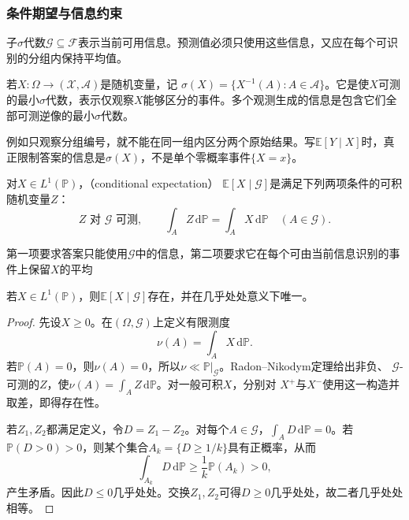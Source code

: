 \subsubsection{条件期望与信息约束}

子\(\sigma\)代数\(\mathcal{G}\subseteq\mathcal{F}\)表示当前可用信息。预测值必须只使用这些信息，又应在每个可识别的分组内保持平均值。
\begin{definition}[观测生成的信息]
  \label{def:probability-generated-information}
若\(X:\Omega\to(\mathcal X,\mathcal A)\)是随机变量，记
\(\sigma(X)=\{X^{-1}(A):A\in\mathcal A\}\)。它是使\(X\)可测的最小\(\sigma\)代数，表示仅观察\(X\)能够区分的事件。多个观测生成的信息是包含它们全部可测逆像的最小\(\sigma\)代数。
\end{definition}
例如只观察分组编号，就不能在同一组内区分两个原始结果。写\(\mathbb E[Y\mid X]\)时，真正限制答案的信息是\(\sigma(X)\)，不是单个零概率事件\(\{X=x\}\)。
\begin{definition}[条件期望]
  \label{def:probability-conditional-expectation}
对\(X\in L^1(\mathbb P)\)，（conditional expectation）
\(\mathbb{E}[X\mid\mathcal{G}]\)是满足下列两项条件的可积随机变量\(Z\)：
\[ Z\text{ 对 }\mathcal{G}\text{ 可测},
  \qquad\int_A Z\,\mathrm{d}\mathbb{P}=\int_A X\,\mathrm{d}\mathbb{P}\quad(A\in\mathcal{G}). \]
\end{definition}
第一项要求答案只能使用\(\mathcal{G}\)中的信息，第二项要求它在每个可由当前信息识别的事件上保留\(X\)的平均

\begin{theorem}[条件期望的存在与唯一性]
\label{thm:probability-conditional-expectation-existence}
若\(X\in L^1(\mathbb{P})\)，则\(\mathbb{E}[X\mid\mathcal{G}]\)存在，并在几乎处处意义下唯一。
\end{theorem}

\begin{proof}
先设\(X\geq0\)。在\((\Omega,\mathcal{G})\)上定义有限测度
\[ \nu(A)=\int_A X\,\mathrm{d}\mathbb{P}. \]
若\(\mathbb{P}(A)=0\)，则\(\nu(A)=0\)，所以\(\nu\ll\mathbb{P}|_{\mathcal{G}}\)。Radon--Nikodym定理给出非负、
\(\mathcal{G}\)-可测的\(Z\)，使\(\nu(A)=\int_A Z\,\mathrm{d}\mathbb{P}\)。对一般可积\(X\)，分别对
\(X^+\)与\(X^-\)使用这一构造并取差，即得存在性。

若\(Z_1,Z_2\)都满足定义，令\(D=Z_1-Z_2\)。对每个\(A\in\mathcal{G}\)，\(\int_A D\,\mathrm{d}\mathbb{P}=0\)。若
\(\mathbb{P}(D>0)>0\)，则某个集合\(A_k=\{D\geq1/k\}\)具有正概率，从而
\[ \int_{A_k}D\,\mathrm{d}\mathbb{P}
  \geq\frac{1}{k}\mathbb{P}(A_k)>0, \]
产生矛盾。因此\(D\leq0\)几乎处处。交换\(Z_1,Z_2\)可得\(D\geq0\)几乎处处，故二者几乎处处相等。
\end{proof}

